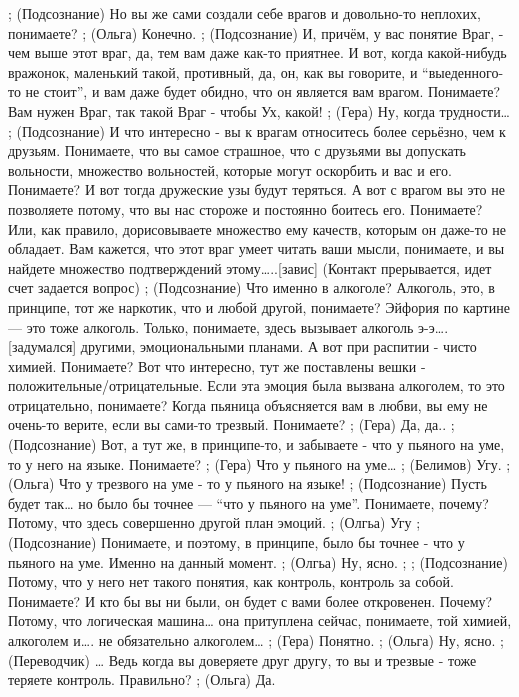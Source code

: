 ;	(Подсознание) Но вы же сами создали себе врагов и довольно-то неплохих, понимаете?
;	(Ольга) Конечно.
;	(Подсознание) И, причём, у вас понятие Враг, - чем выше этот враг, да, тем вам даже как-то приятнее. И вот, когда какой-нибудь вражонок, маленький такой, противный, да, он, как вы говорите, и ``выеденного-то не стоит'', и вам даже будет обидно, что он является вам врагом. Понимаете? Вам нужен Враг, так такой Враг - чтобы Ух, какой! 
;	(Гера) Ну, когда трудности…
;	(Подсознание) И что интересно - вы к врагам относитесь более серьёзно, чем к друзьям. Понимаете, что вы самое страшное, что с друзьями вы допускать вольности, множество вольностей, которые могут оскорбить и вас и его. Понимаете? И вот тогда дружеские узы будут теряться. А вот с врагом вы это не позволяете потому, что вы нас стороже и постоянно боитесь его. Понимаете? Или, как правило, дорисовываете множество ему качеств, которым он даже-то не обладает. Вам кажется, что этот враг умеет читать ваши мысли, понимаете, и вы найдете множество подтверждений этому…..[завис]
(Контакт прерывается, идет счет задается вопрос)
;	(Подсознание) Что именно в алкоголе? Алкоголь, это, в принципе, тот же наркотик, что и любой другой, понимаете?  Эйфория по картине — это тоже алкоголь. Только, понимаете, здесь вызывает алкоголь э-э….[задумался] другими, эмоциональными планами. А вот при распитии - чисто химией. Понимаете? Вот что интересно, тут же поставлены вешки - положительные/отрицательные. Если эта эмоция была вызвана алкоголем, то это отрицательно, понимаете? Когда пьяница объясняется  вам в любви, вы ему не очень-то верите, если вы сами-то трезвый. Понимаете?
;	(Гера) Да, да..
;	(Подсознание) Вот, а тут же, в принципе-то, и забываете - что у пьяного на уме, то у него на языке. Понимаете?
;	(Гера) Что у пьяного на уме…
;	(Белимов) Угу.
;	(Ольга) Что у трезвого на уме - то у пьяного на языке!
;	(Подсознание) Пусть будет так… но было бы точнее — ``что у пьяного на уме''. Понимаете, почему? Потому, что здесь совершенно другой план эмоций.
;	(Олгьа) Угу
;	(Подсознание) Понимаете, и поэтому, в принципе, было бы точнее - что у пьяного на уме. Именно на данный момент.
;	(Олгьа) Ну, ясно.
;	
;	(Подсознание) Потому, что у него нет такого понятия, как контроль, контроль за собой. Понимаете? И кто бы вы ни были, он будет с вами более откровенен. Почему? Потому, что логическая машина… она притуплена сейчас, понимаете, той химией, алкоголем и…. не обязательно алкоголем…
;	(Гера) Понятно.
;	(Ольга) Ну, ясно.
;	(Переводчик) … Ведь когда вы доверяете друг другу, то вы и трезвые - тоже теряете контроль. Правильно?
;	(Ольга) Да.

